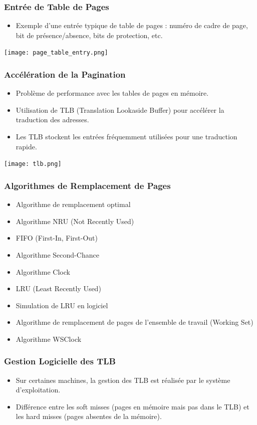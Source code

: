 \documentclass{beamer}
\begin{document}
\begin{frame}
\frametitle{Entrée de Table de Pages}
\begin{itemize}
    \item Exemple d'une entrée typique de table de pages : numéro de cadre de page, bit de présence/absence, bits de protection, etc.
\end{itemize}
\texttt{[image: page\_table\_entry.png]}
\end{frame}

\begin{frame}
\frametitle{Accélération de la Pagination}
\begin{itemize}
    \item Problème de performance avec les tables de pages en mémoire.
    \item Utilisation de TLB (Translation Lookaside Buffer) pour accélérer la traduction des adresses.
    \item Les TLB stockent les entrées fréquemment utilisées pour une traduction rapide.
\end{itemize}
\texttt{[image: tlb.png]}
\end{frame}

\begin{frame}
\frametitle{Algorithmes de Remplacement de Pages}
\begin{itemize}
    \item Algorithme de remplacement optimal
    \item Algorithme NRU (Not Recently Used)
    \item FIFO (First-In, First-Out)
    \item Algorithme Second-Chance
    \item Algorithme Clock
    \item LRU (Least Recently Used)
    \item Simulation de LRU en logiciel
    \item Algorithme de remplacement de pages de l'ensemble de travail (Working Set)
    \item Algorithme WSClock
\end{itemize}
\end{frame}

\begin{frame}
\frametitle{Gestion Logicielle des TLB}
\begin{itemize}
    \item Sur certaines machines, la gestion des TLB est réalisée par le système d'exploitation.
    \item Différence entre les soft misses (pages en mémoire mais pas dans le TLB) et les hard misses (pages absentes de la mémoire).
\end{itemize}
\end{frame}
\end{document}
